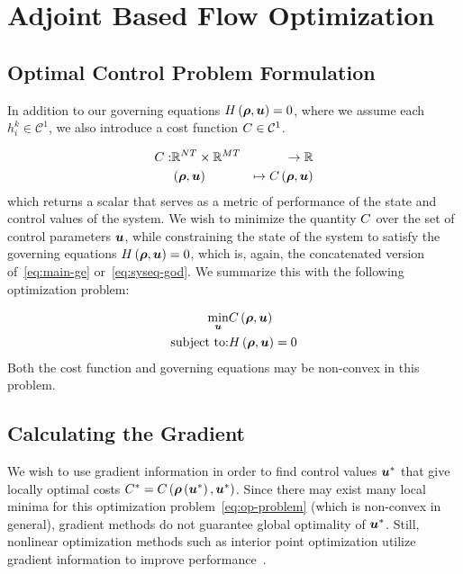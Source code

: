 \section{Adjoint Based Flow Optimization\label{sec:Adjoint-method}}


\subsection{Optimal Control Problem Formulation\label{par:Optimization-Problem}}

In addition to our governing equations $\sys\left(\state,\control\right)=0$, where we assume each $h_i^k \in \mathcal{C}^1$,
we also introduce a cost function $C \in \mathcal{C}^1$.

\begin{eqnarray*}
\cost: & \mathbb{R}^{\nlinks T}\times\mathbb{R}^{\ncontrols T} & \rightarrow\mathbb{R}\\
& \left(\state,\control\right) & \mapsto\cost\left(\state,\control\right)
\end{eqnarray*}
which returns a scalar that serves as a metric of performance of the
state and control values of the system. We wish to minimize the quantity
$C$ over the set of control parameters $\control$, while constraining
the state of the system to satisfy the governing equations $\sys\left(\state,\control\right)=0$,
which is, again, the concatenated version of~\eqref{eq:main-ge} or~\eqref{eq:syseq-god}.
We summarize this with the following optimization problem:

\begin{eqnarray}
\underset{\control}{\min} & \cost\left(\state,\control\right)\nonumber \\
\text{subject to:} & \sys\left(\state,\control\right)=0\label{eq:op-problem}
\end{eqnarray}
Both the cost function and governing equations may be non-convex in
this problem.


\subsection{Calculating the Gradient\label{par:Calculating-the-gradient}}

We wish to use gradient information in order to find control values
$\control^{*}$ that give locally optimal costs $\cost^{*}=\cost\left(\state\left(\control^{*}\right),\control^{*}\right)$.
Since there may exist many local minima for this optimization problem~\eqref{eq:op-problem}
(which is non-convex in general), gradient\emph{ }methods do not guarantee
global optimality of $\control^{*}$\emph{. }Still, nonlinear optimization
methods such as interior point optimization utilize gradient information
to improve performance~\cite{Andreas2005}.

